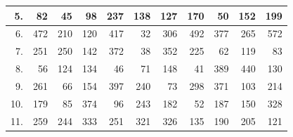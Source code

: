 \begin{table}[H]
{\begin{tabular}{|r|r|r|r|r|r|r|r|r|r|r|}
5.                     & 82                             & 45                              & 98                               & 237                              & 138                              & 127                              & 170                              & 50                               & 152                              & 199                              \\ \hline
6.                     & 472                            & 210                             & 120                              & 417                              & 32                               & 306                              & 492                              & 377                              & 265                              & 572                              \\ \hline
7.                     & 251                            & 250                             & 142                              & 372                              & 38                               & 352                              & 225                              & 62                               & 119                              & 83                               \\ \hline
8.                     & 56                             & 124                             & 134                              & 46                               & 71                               & 148                              & 41                               & 389                              & 440                              & 130                              \\ \hline
9.                     & 261                            & 66                              & 154                              & 397                              & 240                              & 73                               & 298                              & 371                              & 103                              & 214                              \\ \hline
10.                    & 179                            & 85                              & 374                              & 96                               & 243                              & 182                              & 52                               & 187                              & 150                              & 328                              \\ \hline
11.                    & 259                            & 244                             & 333                              & 251                              & 321                              & 326                              & 135                              & 190                              & 205                              & 121                              \\ \hline

\end{tabular}}
\end{table}

